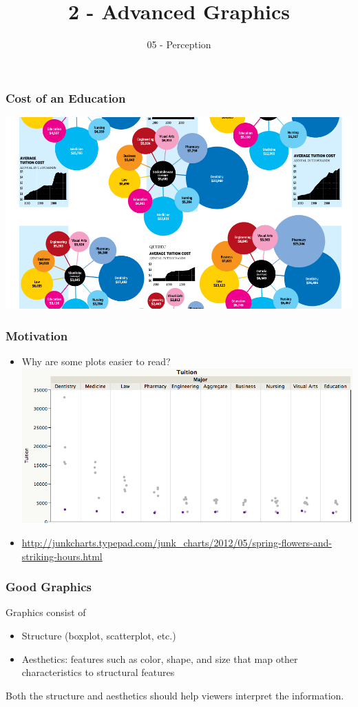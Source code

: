 \documentclass{beamer}
\title[ 2-Graphics]{2 - Advanced Graphics}
\subtitle{05 - Perception}
\date{\hspace{1in}}
\institute[ISU]{Iowa State University}
\begin{document}
\begin{frame}
\maketitle
\end{frame}


\begin{frame}
    \frametitle{Cost of an Education}
\includegraphics[keepaspectratio=TRUE,width=.9\linewidth]{junkcharts.png}
\end{frame}
\begin{frame}
    \frametitle{Motivation}
    \begin{itemize}
    \item Why are some plots easier to read?
    \hspace{-24pt}\includegraphics[keepaspectratio=TRUE,width=.9\linewidth]{dotplot.png}
    \item \url{http://junkcharts.typepad.com/junk_charts/2012/05/spring-flowers-and-striking-hours.html}
    \end{itemize}
\end{frame}

\begin{frame}
\frametitle{Good Graphics}
Graphics consist of 
\begin{itemize}
\item Structure (boxplot, scatterplot, etc.)
\item Aesthetics: features such as color, shape, and size that map other characteristics to structural features
\end{itemize}\bigskip
Both the structure and aesthetics should help viewers interpret the information.
\end{frame}
\end{document}
